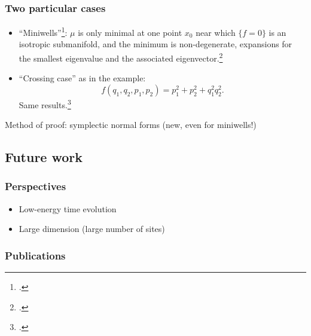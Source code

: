 \documentclass[mathserif]{beamer}
\begin{document}
\begin{frame}
  \frametitle{Two particular cases}
  \begin{itemize}
  \item ``Miniwells''\footcite{helffer_puits_1986}: $\mu$ is only minimal at one point $x_0$ near which $\{f=0\}$ is
    an isotropic submanifold, and the minimum is non-degenerate,
    expansions for the smallest eigenvalue and the associated
    eigenvector.\footcite{deleporte_low-energy_2017}
  \item ``Crossing case'' as in the example:
    \[
      f(q_1,q_2,p_1,p_2)=p_1^2+p_2^2+q_1^2q_2^2.
      \]
    Same results.\footcite{deleporte_low-energy_2017}
  \end{itemize}
  Method of proof: symplectic normal forms (new, even for miniwells!)
\end{frame}

\subsection{Future work}
\begin{frame}
  \frametitle{Perspectives}
    \begin{itemize}
    \item Low-energy time evolution
    \item Large dimension (large number of sites)
    \end{itemize}
  \end{frame}

  \begin{frame}
    \frametitle{Publications}
    \printbibliography[keyword=Deleporte,heading=none]
  \end{frame}
\end{document}
